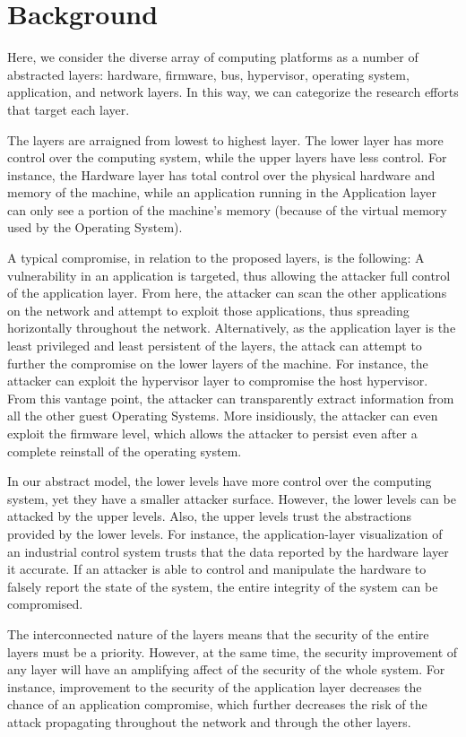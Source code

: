 \documentclass[11pt,letterpaper]{article}
\begin{document}
\section{Background}

Here, we consider the diverse array of computing platforms as a number
of abstracted layers: hardware, firmware, bus, hypervisor, operating
system, application, and network layers. In this way, we can
categorize the research efforts that target each layer.

The layers are arraigned from lowest to highest layer. The lower layer
has more control over the computing system, while the upper layers
have less control. For instance, the Hardware layer has total control
over the physical hardware and memory of the machine, while an
application running in the Application layer can only see a portion of
the machine's memory (because of the virtual memory used by the
Operating System).

A typical compromise, in relation to the proposed layers, is the
following: A vulnerability in an application is targeted, thus
allowing the attacker full control of the application layer. From
here, the attacker can scan the other applications on the network and
attempt to exploit those applications, thus spreading horizontally
throughout the network. Alternatively, as the application layer is the
least privileged and least persistent of the layers, the attack can
attempt to further the compromise on the lower layers of the machine.
For instance, the attacker can exploit the hypervisor layer to
compromise the host hypervisor. From this vantage point, the attacker
can transparently extract information from all the other guest
Operating Systems. More insidiously, the attacker can even exploit the
firmware level, which allows the attacker to persist even after
a complete reinstall of the operating system.

In our abstract model, the lower levels have more control over the
computing system, yet they have a smaller attacker surface. However,
the lower levels can be attacked by the upper levels. Also, the upper
levels trust the abstractions provided by the lower levels. For
instance, the application-layer visualization of an industrial control
system trusts that the data reported by the hardware layer it
accurate. If an attacker is able to control and manipulate the
hardware to falsely report the state of the system, the entire
integrity of the system can be compromised.

The interconnected nature of the layers means that the security of the
entire layers must be a priority. However, at the same time, the
security improvement of any layer will have an amplifying affect of
the security of the whole system. For instance, improvement to the
security of the application layer decreases the chance of an
application compromise, which further decreases the risk of the attack
propagating throughout the network and through the other layers.
\end{document}
